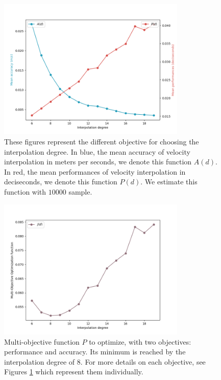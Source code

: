 \documentclass[final]{jcgt}
\begin{document}
\begin{figure}[ht]
	\centering
	\includegraphics[width=0.8\textwidth]{Figures/interpolationMeanPerformancesAndAccuracy.png}
	\caption{These figures represent the different objective for choosing the interpolation degree. In blue, the mean accuracy of velocity interpolation in meters per seconds, we denote this function $A(d)$. In red, the mean performances of velocity interpolation in deciseconds, we denote this function $P(d)$. We estimate this function with $10000$ sample.}
	\label{fig:interpolationCriteria}
\end{figure}

\begin{figure}[ht]
	\centering
	\includegraphics[width=0.8\textwidth]{Figures/multiObjectiveAccuracy1Duration2.png}
	\caption{Multi-objective function $P$ to optimize, with two objectives: performance and accuracy.
		Its minimum is reached by the interpolation degree of $8$. For more details on each objective, see Figures \ref{fig:interpolationCriteria} which represent them individually.}
	\label{fig:multiObjectiveFunction}
\end{figure}
\end{document}
